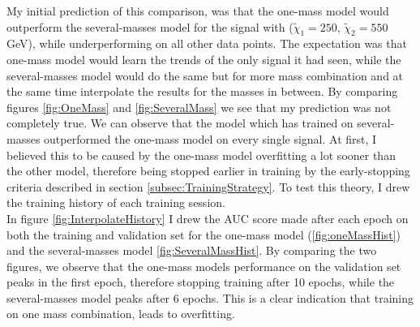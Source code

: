 My initial prediction of this comparison, was that the one-mass model would outperform the several-masses model for the signal with
($\tilde{\chi}_1=250$, $\tilde{\chi}_2=550$GeV), while underperforming on all other data points. The expectation was that one-mass model 
would learn the trends of the only signal it had seen, while the several-masses model would do the same but for more mass combination and 
at the same time interpolate the results for the masses in between. By comparing figures \ref{fig:OneMass} and \ref{fig:SeveralMass} we 
see that my prediction was not completely true. We can observe that the model which has trained on several-masses outperformed the 
one-mass model on every single signal. At first, I believed this to be caused by the one-mass model overfitting a lot sooner than the other 
model, therefore being stopped earlier in training by the early-stopping criteria described in section \ref{subsec:TrainingStrategy}. 
To test this theory, I drew the training history of each training session.
\\
In figure \ref{fig:InterpolateHistory} I drew the \ac{AUC} score made after each epoch on both the training and validation set
for the one-mass model (\ref{fig:oneMassHist}) and the several-masses model \ref{fig:SeveralMassHist}. By comparing the two figures,
we observe that the one-mass models performance on the validation set peaks in the first epoch, therefore stopping training after 
10 epochs, while the several-masses model peaks after 6 epochs. This is a clear indication that training on one mass combination, leads 
to overfitting. 
